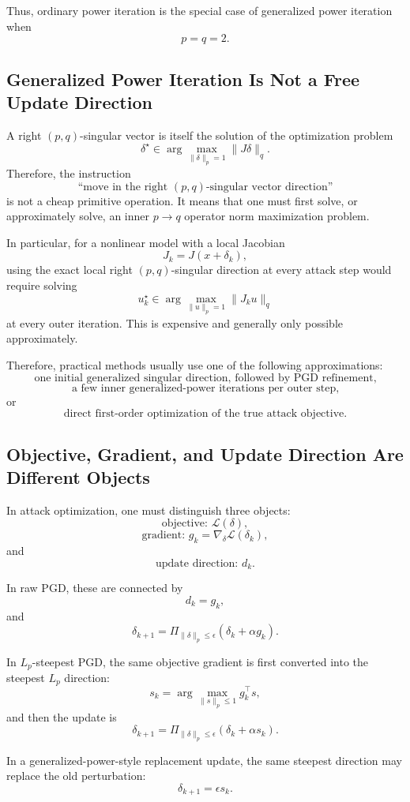 \documentclass{article}
\begin{document}
Thus, ordinary power iteration is the special case of generalized power iteration when
\[
p=q=2.
\]

\subsection{Generalized Power Iteration Is Not a Free Update Direction}

A right $(p,q)$-singular vector is itself the solution of the optimization problem
\[
\delta^\star
\in
\arg\max_{\|\delta\|_p=1}
\|J\delta\|_q.
\]
Therefore, the instruction
\[
\text{``move in the right $(p,q)$-singular vector direction''}
\]
is not a cheap primitive operation. It means that one must first solve, or approximately solve, an inner $p\to q$ operator norm maximization problem.

In particular, for a nonlinear model with a local Jacobian
\[
J_k=J(x+\delta_k),
\]
using the exact local right $(p,q)$-singular direction at every attack step would require solving
\[
u_k^\star
\in
\arg\max_{\|u\|_p=1}
\|J_k u\|_q
\]
at every outer iteration. This is expensive and generally only possible approximately.

Therefore, practical methods usually use one of the following approximations:
\[
\text{one initial generalized singular direction, followed by PGD refinement,}
\]
\[
\text{a few inner generalized-power iterations per outer step,}
\]
or
\[
\text{direct first-order optimization of the true attack objective.}
\]

\subsection{Objective, Gradient, and Update Direction Are Different Objects}

In attack optimization, one must distinguish three objects:
\[
\text{objective: } \mathcal L(\delta),
\]
\[
\text{gradient: } g_k=\nabla_\delta\mathcal L(\delta_k),
\]
and
\[
\text{update direction: } d_k.
\]

In raw PGD, these are connected by
\[
d_k=g_k,
\]
and
\[
\delta_{k+1}
=
\Pi_{\|\delta\|_p\le\epsilon}
\left(
\delta_k+\alpha g_k
\right).
\]

In $L_p$-steepest PGD, the same objective gradient is first converted into the steepest $L_p$ direction:
\[
s_k
=
\arg\max_{\|s\|_p\le1}
g_k^\top s,
\]
and then the update is
\[
\delta_{k+1}
=
\Pi_{\|\delta\|_p\le\epsilon}
\left(
\delta_k+\alpha s_k
\right).
\]

In a generalized-power-style replacement update, the same steepest direction may replace the old perturbation:
\[
\delta_{k+1}
=
\epsilon s_k.
\]
\end{document}
